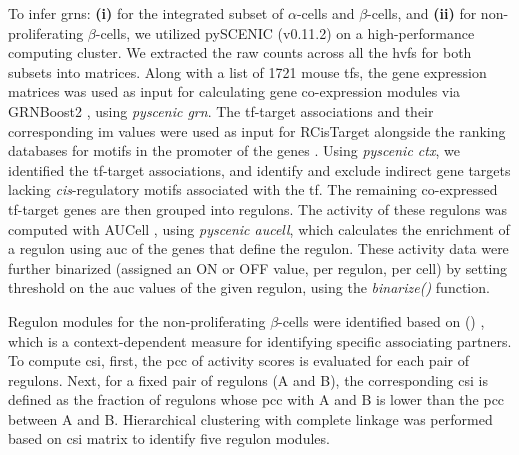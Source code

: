 \par To infer \glspl{grn}: \textbf{(i)} for the integrated subset of $\alpha$-cells and $\beta$-cells, and \textbf{(ii)} for non-proliferating $\beta$-cells, we utilized pySCENIC (v0.11.2) \textbf{\cite{kumar_inference_2021}} on a high-performance computing cluster. We extracted the raw counts across all the \glspl{hvf} for both subsets into matrices. Along with a list of 1721 mouse \glspl{tf}, the gene expression matrices was used as input for calculating gene co-expression modules via GRNBoost2 \textbf{\cite{moerman_grnboost2_2019}}, using \textit{pyscenic grn}. The \gls{tf}-target associations and their corresponding \gls{im} values were used as input for RCisTarget alongside the ranking databases for motifs in the promoter of the genes \textbf{\cite{aibar_rcistarget_nodate}}. Using \textit{pyscenic ctx}, we identified the \gls{tf}-target associations, and identify and exclude indirect gene targets lacking \textit{cis}-regulatory motifs associated with the \gls{tf}. The remaining co-expressed \gls{tf}-target genes are then grouped into regulons. The activity of these regulons was computed with AUCell \textbf{\cite{aibar_aucell_nodate}}, using \textit{pyscenic aucell}, which calculates the enrichment of a regulon using \gls{auc} of the genes that define the regulon. These activity data were further binarized (assigned an ON or OFF value, per regulon, per cell) by setting threshold on the \gls{auc} values of the given regulon, using the \textit{binarize()} function.\\

\par Regulon modules for the non-proliferating $\beta$-cells were identified based on  () \textbf{\cite{fuxman_bass_using_2013}}, which is a context-dependent measure for identifying specific associating partners. To compute \gls{csi}, first, the \gls{pcc} of activity scores is evaluated for each pair of regulons. Next, for a fixed pair of regulons (A and B), the corresponding \gls{csi} is defined as the fraction of regulons whose \gls{pcc} with A and B is lower than the \gls{pcc} between A and B. Hierarchical clustering with complete linkage was performed based on \gls{csi} matrix to identify five regulon modules.\\

